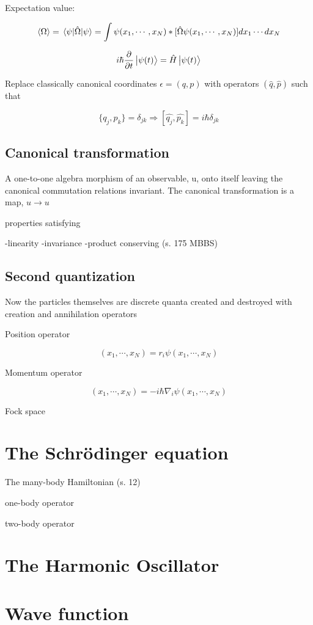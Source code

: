 Expectation value: 

\begin{equation}
\expval{\Omega} = \expval{\hat{\Omega}}{\psi} = \int \psi (x_1, \cdots , x_N)\ast [\hat{\Omega} \psi (x_1, \cdots, x_N)] dx_1 \cdots dx_N
\end{equation}

\begin{equation}
i \hbar \frac{\partial}{\partial t} \ket{\psi(t)} = \hat{H} \ket{\psi(t)}
\end{equation}

Replace classically canonical coordinates $\epsilon = (q, p)$ with operators $(\hat{q}, \hat{p})$ such that

\begin{equation}
\{q_j, p_k\} = \delta_{jk} \Rightarrow [\hat{q_j}, \hat{p_k}] = i \hbar \delta_{jk}
\end{equation}

\subsection{Canonical transformation}

A one-to-one algebra morphism of an observable, u, onto itself leaving the canonical commutation relations invariant. The canonical transformation is a map, $u \rightarrow u$ 

properties satisfying 

-linearity
-invariance
-product conserving (s. 175 MBBS)

\subsection{Second quantization}

Now the particles themselves are discrete quanta created and destroyed with creation and annihilation operators

Position operator 

\begin{equation}
[\hat{r_i} \psi](x_1, \cdots, x_N) = r_i \psi (x_1, \cdots, x_N) 
\end{equation}

Momentum operator 

\begin{equation}
[\hat{p_i} \psi](x_1, \cdots, x_N) = -i \hbar \nabla_i \psi (x_1, \cdots, x_N) 
\end{equation}

Fock space

\section{The Schrödinger equation}

The many-body Hamiltonian (s. 12) 

one-body operator  

two-body operator

\section{The Harmonic Oscillator}



\section{Wave function}